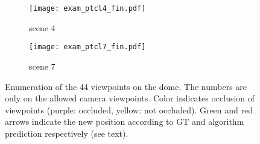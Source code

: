 \documentclass[10pt,twocolumn,letterpaper]{article}
\begin{document}
\begin{figure} 

   
  \begin{subfigure}[b]{0.48\columnwidth}
    \begin{center}
        \texttt{[image: exam\_ptcl4\_fin.pdf]}
		\caption{scene 4}
        \label{fig:dome-scenes:scn4}
    \end{center}
 \end{subfigure}
 \begin{subfigure}[b]{0.48\columnwidth}
   \begin{center}
        \texttt{[image: exam\_ptcl7\_fin.pdf]}
        \caption{scene 7}
        \label{fig:dome-scenes:scn7}
    \end{center}
  \end{subfigure}

  \caption{Enumeration of the 44 viewpoints on the dome. The numbers are only on the allowed camera viewpoints. Color indicates occlusion of viewpoints (purple: occluded, yellow: not occluded). Green and red arrows indicate the new position according to GT and algorithm prediction respectively (see text). }
  \label{fig:dome-scenes}
\end{figure}
\end{document}
